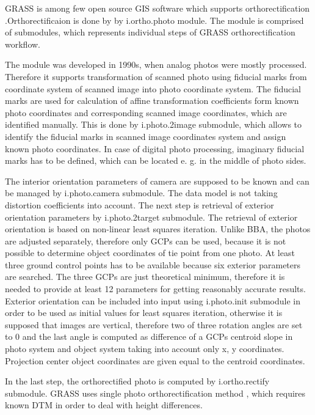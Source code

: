 \documentclass[a4paper,12pt]{article}
\begin{document}
GRASS is among few open source GIS software which supports orthorectification
\cite{rocchini2012robust}.Orthorectificaion is done by 
by i.ortho.photo \cite{i.ortho.photo} module.
The module is comprised of submodules, which represents individual steps of 
GRASS orthorectification workflow.


The module was developed in 1990s,  
when analog photos were mostly processed. Therefore it supports 
 transformation of scanned photo using fiducial marks from coordinate system of scanned image into 
 photo coordinate system. The fiducial marks are used for calculation of 
 affine transformation coefficients form known photo coordinates 
 and corresponding scanned image coordinates, which are identified manually. 
 This is done by i.photo.2image submodule, which allows to identify the fiducial 
 marks in scanned image coordinates system and assign known photo coordinates.
  In case of digital photo processing, imaginary fiducial marks has to be defined, which
can be located e. g. in the middle of photo sides.  
  

The interior orientation parameters of camera are supposed to be known and can 
be managed by i.photo.camera submodule.
The data model is not taking distortion 
coefficients into account. 
The next step is retrieval of exterior orientation parameters by i.photo.2target submodule.  
The retrieval 
of exterior orientation is based on non-linear least squares iteration. Unlike BBA,
the photos are adjusted separately, therefore only GCPs can be used,
because it is not possible to determine object coordinates of tie point from one photo.
At least three ground control points has to be available because six exterior parameters are 
searched. The three GCPs are just theoretical minimum, therefore it is needed to provide at least 12 parameters
for getting reasonably accurate results. Exterior orientation 
can be included into input using i.photo.init submodule in order to be used as initial values for least squares iteration,
otherwise it is supposed that images are vertical, therefore two of three rotation
angles are set to 0 and the last angle is computed as difference of a GCPs centroid  slope
in photo system and object system taking into account only x, y coordinates.
Projection center object coordinates are given equal to the centroid coordinates.

In the last step, the orthorectified photo is computed by i.ortho.rectify submodule. GRASS uses single photo orthorectification
method \label{sec:single_ortho}, which requires known DTM in order to deal with height differences. 
\end{document}
